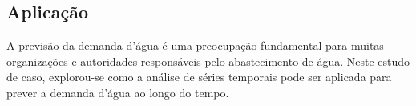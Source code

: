 \subsection{Aplica\c c\~ao}\label{subsec:estudo-reslt}


A previsão da demanda d'água é uma preocupação fundamental para muitas organizações e autoridades responsáveis pelo abastecimento de água. Neste estudo de caso, explorou-se como a análise de séries temporais pode ser aplicada para prever a demanda d'água ao longo do tempo.

%



%
%
%
%
%
%
%

